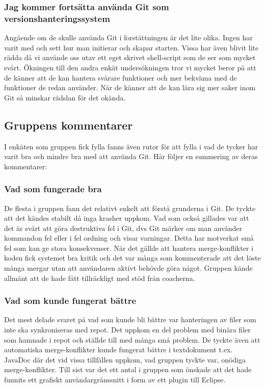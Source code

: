 \subsubsection{Jag kommer fortsätta använda Git som versionshanteringssystem}

Angående om de skulle använda Git i forstättningen är det lite olika. Ingen har varit med och sett hur man initierar och skapar starten. Vissa har även blivit lite rädda då vi använde oss utav ett eget skrivet shell-script som de ser som mycket svårt. Ökningen till den andra enkät undersökningen tror vi mycket beror på att de känner att de kan hantera svårare funktioner och mer bekväma med de funktioner de redan använder. När de känner att de kan lära sig mer saker inom Git så minskar rädslan för det okända. 

\subsection{Gruppens kommentarer}
I enkäten som gruppen fick fylla fanns även rutor för att fylla i vad de tycker har varit bra och mindre bra med att använda Git. Här följer en summering av deras kommentarer:

\subsubsection{Vad som fungerade bra}
De flesta i gruppen fann det relativt enkelt att förstå grunderna i Git. De tyckte att det kändes stabilt då inga krasher uppkom. Vad som också gillades var att det är svårt att göra destruktiva fel i Git, dvs Git märker om man använder kommandon fel eller i fel ordning och visar varningar. Detta har motverkat små fel som kan ge stora konsekvenser. När det gällde att hantera merge-konflikter i koden fick systemet bra kritik och det var många som kommenterade att det löste många mergar utan att användaren aktivt behövde göra något. Gruppen kände allmänt att de hade fått tillräckligt med stöd från coacherna.

\subsubsection{Vad som kunde fungerat bättre}
Det mest delade svaret på vad som kunde bli bättre var hanteringen av filer som inte ska synkroniseras med repot. Det uppkom en del problem med binära filer som hamnade i repot och ställde till med många små problem. De tyckte även att automatiska merge-konflikter kunde fungerat bättre i textdokument t.ex. JavaDoc där det vid vissa tillfällen uppkom, vad gruppen tyckte var, onödiga merge-konflikter. Till sist var det ett antal i gruppen som önskade att det hade funnits ett grafiskt användargränssnitt i form av ett plugin till Eclipse. 

